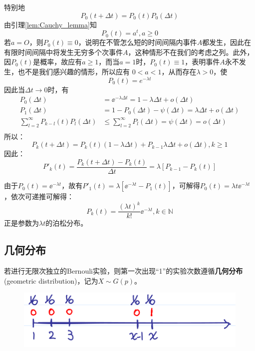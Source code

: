 特别地
\[ P_0(t+\Delta t)=P_0(t)P_0(\Delta t) \]
由引理\ref{lem:Cauchy_lemma}知
\[ P_0(t)=a^{t}, a\ge 0 \]
若$a=O$，则$P_0(t) \equiv 0$，说明在不管怎么短的时间间隔内事件$A$都发生，因此在有限时间间隔中将发生无穷多个次事件$A$，这种情形不在我们的考虑之列。此外，因$P_0(t)$是概率，故应有$a\ge 1$，而当$a=1$时，$P_0(t) \equiv 1$，表明事件$A$永不发生，也不是我们感兴趣的情形，所以应有 $0<a<1$，从而存在$\lambda>0$，使
\[ P_0(t)=e^{-\lambda t} \]
因此当$\Delta t \to 0$时，有
\begin{align*}
    P_{0}(\Delta t)                                & =\ee^{-\lambda \Delta t}=1-\lambda \Delta t+o(\Delta t)                  \\
    P_{1}(\Delta t)                                & =1-P_{0}(\Delta t)-\psi(\Delta t)=\lambda \Delta t+o(\Delta t)           \\
    \sum_{l=2}^{\infty} P_{k-l}(t) P_{l}(\Delta t) & \leqslant \sum_{l=2}^{\infty} P_{l}(\Delta t)=\psi(\Delta t)=o(\Delta t) \\
\end{align*}
所以：
\[ P_k(t+\Delta t)=P_k(t)(1-\lambda \Delta t) + P_{k-1}\lambda \Delta t+ o(\Delta t) ,k\ge 1\]
因此：
\[ P'_k(t)= \frac{P_k(t+\Delta t)-P_k(t)}{\Delta t} = \lambda[P_{k-1}-P_k(t)] \]

由于$P_0(t)=\ee^{-\lambda t}$，故有$P'_1(t)=\lambda[\ee^{-\lambda t}-P_1(t)]$，可解得$P_0(t)=\lambda t \ee^{-\lambda t}$，依次可递推可解得：
\[ P_k(t)=\frac{(\lambda t)^k}{k!}\ee^{-\lambda t}, k \in \mathbb{N}\]
正是参数为$\lambda t$的泊松分布。

\subsection{几何分布}

\begin{definition}
    若进行无限次独立的Bernouli实验，则第一次出现“1”的实验次数遵循\textbf{几何分布}(geometric distribution)，记为$X \sim G(p)$。
\end{definition}

\begin{figure}[h]
    \centering
    \includegraphics{image/geometric_dist_intu.png}
\end{figure}


